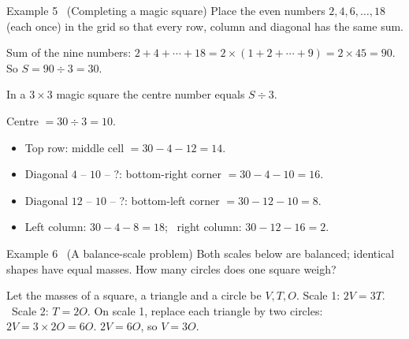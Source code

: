\begin{exbox}{Example 5 \ (Completing a magic square)}
Place the even numbers $2, 4, 6, \ldots, 18$ (each once) in the grid so that every row, column and diagonal has the same sum.
\begin{center}\end{center}
\guide
{}
Sum of the nine numbers: $2 + 4 + \cdots + 18 = 2\times(1 + 2 + \cdots + 9) = 2\times 45 = 90$. So $S = 90 \div 3 = 30$.
\begin{recallbox}In a $3\times 3$ magic square the centre number equals $S \div 3$.\end{recallbox}
Centre $= 30 \div 3 = 10$.
\begin{itemize}[leftmargin=1.4em,itemsep=0pt,topsep=1pt]
\item Top row: middle cell $= 30 - 4 - 12 = 14$.
\item Diagonal $4$ -- $10$ -- ?: bottom-right corner $= 30 - 4 - 10 = 16$.
\item Diagonal $12$ -- $10$ -- ?: bottom-left corner $= 30 - 12 - 10 = 8$.
\item Left column: $30 - 4 - 8 = 18$; \ right column: $30 - 12 - 16 = 2$.
\end{itemize}
\begin{center}\end{center}
\end{exbox}

\begin{exbox}{Example 6 \ (A balance-scale problem)}
Both scales below are balanced; identical shapes have equal masses. How many circles does one square weigh?
\begin{center}
\lgaScale{\lgaSq\,\lgaSq}{\lgaTri\,\lgaTri\,\lgaTri}\hspace{1cm}\lgaScale{\lgaTri}{\lgaCir\,\lgaCir}
\end{center}
\guide
{}
Let the masses of a square, a triangle and a circle be $V, T, O$. Scale 1: $2V = 3T$. \ Scale 2: $T = 2O$.
On scale 1, replace each triangle by two circles: $2V = 3\times 2O = 6O$.
$2V = 6O$, so $V = 3O$.
\end{exbox}


